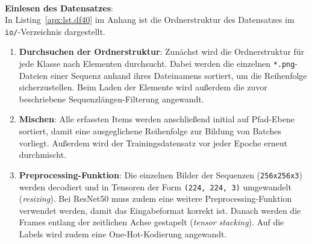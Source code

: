 \documentclass{article}
\newcommand{\imgsize}{\texttt{(224, 224, 3)}\xspace}
\newcommand{\resnet}{ResNet50\xspace}
\begin{document}
\\[0.5em]
\textbf{Einlesen des Datensatzes}:\\
In Listing~\ref{apx:lst.df40} im Anhang ist die Ordnerstruktur des Datensatzes im \texttt{io/}-Verzeichnis dargestellt.
\begin{enumerate}
    \item\textbf{Durchsuchen der Ordnerstruktur}: Zunächst wird die Ordnerstruktur für jede Klasse nach Elementen durchsucht. Dabei werden die einzelnen \texttt{*.png}-Dateien einer Sequenz anhand ihres Dateinamens sortiert, um die Reihenfolge sicherzustellen. Beim Laden der Elemente wird außerdem die zuvor beschriebene Sequenzlängen-Filterung angewandt.
    \item\textbf{Mischen}: Alle erfassten Items werden anschließend initial auf Pfad-Ebene sortiert, damit eine ausgeglichene Reihenfolge zur Bildung von Batches vorliegt. Außerdem wird der Trainingsdatensatz vor jeder Epoche erneut durchmischt.
    \item\textbf{Preprocessing-Funktion}: Die einzelnen Bilder der Sequenzen (\texttt{256x256x3}) werden decodiert und in Tensoren der Form \imgsize umgewandelt (\textit{resizing}). Bei \resnet muss zudem eine weitere Preprocessing-Funktion verwendet werden, damit das Eingabeformat korrekt ist. Danach werden die Frames entlang der zeitlichen Achse gestapelt (\textit{tensor stacking}). Auf die Labels wird zudem eine One-Hot-Kodierung angewandt.
\end{enumerate}
\end{document}
